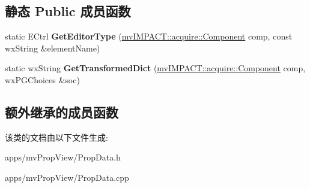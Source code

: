 \subsection*{静态 Public 成员函数}
\begin{DoxyCompactItemize}
\item 
\hypertarget{class_property_object_aadafe8fedb6bce3d048820e84a3891e0}{static E\+Ctrl {\bfseries Get\+Editor\+Type} (\hyperlink{classmv_i_m_p_a_c_t_1_1acquire_1_1_component}{mv\+I\+M\+P\+A\+C\+T\+::acquire\+::\+Component} comp, const wx\+String \&element\+Name)}\label{class_property_object_aadafe8fedb6bce3d048820e84a3891e0}

\item 
\hypertarget{class_property_object_a9aa498fe4eaf4a903393fb2aac8fa4ac}{static wx\+String {\bfseries Get\+Transformed\+Dict} (\hyperlink{classmv_i_m_p_a_c_t_1_1acquire_1_1_component}{mv\+I\+M\+P\+A\+C\+T\+::acquire\+::\+Component} comp, wx\+P\+G\+Choices \&soc)}\label{class_property_object_a9aa498fe4eaf4a903393fb2aac8fa4ac}

\end{DoxyCompactItemize}
\subsection*{额外继承的成员函数}


该类的文档由以下文件生成\+:\begin{DoxyCompactItemize}
\item 
apps/mv\+Prop\+View/Prop\+Data.\+h\item 
apps/mv\+Prop\+View/Prop\+Data.\+cpp\end{DoxyCompactItemize}
